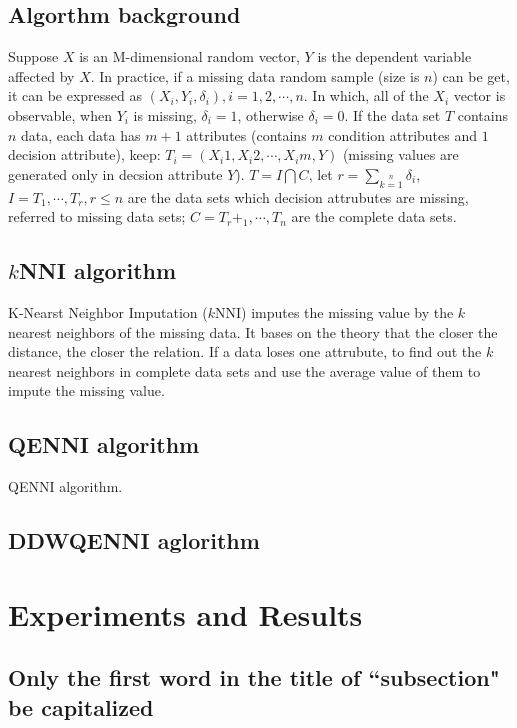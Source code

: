 \documentclass[print]{jicspack}
\begin{document}
\subsection{Algorthm background}
Suppose $X$ is an M-dimensional random vector, $Y$ is the dependent variable affected by $X$. In practice, if a missing data random sample (size is $n$) can be get, it can be expressed as $(X_i, Y_i, \delta_i), i= 1, 2,\cdots, n$. In which, all of the $X_i$ vector is observable, when $Y_i$ is missing, $\delta_i = 1$, otherwise $\delta_i = 0$. If the data set $T$ contains $n$ data, each data has $m + 1$ attributes (contains $m$ condition attributes and $1$ decision attribute), keep: $T_i = (X_i1, X_i2, \cdots, X_im, Y)$ (missing values are generated only in decsion attribute $Y$). $T = I \bigcap C$, let $r = \sum\limits_{k=1}\limits^{n} \delta_i$, $I = {T_1, \cdots, T_r}, r \leq n$ are the data sets which decision attrubutes are missing, referred to missing data sets; $C = {T_r+_1, \cdots, T_n}$ are the complete data sets.
\subsection{$k$NNI algorithm}
\label{2.2}
K-Nearst Neighbor Imputation ($k$NNI) imputes the missing value by the $k$ nearest neighbors of the missing data. It bases on the theory that the closer the distance, the closer the relation. If a data loses one attrubute, to find out the $k$ nearest neighbors in complete data sets and use the average value of them to impute the missing value.

\subsection{QENNI algorithm}
\label{2.3}
QENNI algorithm.

\subsection{DDWQENNI aglorithm}
\label{2.4}


\section{Experiments and Results}
\subsection{Only the first word in the title of ``subsection" be capitalized}
\label{sec:1.1}
\end{document}
